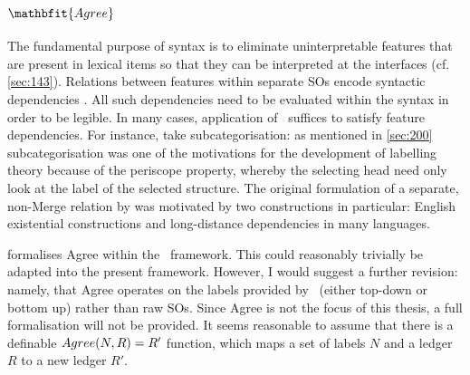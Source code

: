 \subsection[\Agree]{$\mathbfit{\Agree}$}\label{sec:480}

The fundamental purpose of syntax is to eliminate uninterpretable features that are present in lexical items so that they can be interpreted at the interfaces (cf. \autoref{sec:143}). Relations between features within separate SOs encode syntactic dependencies \parencite[cf.][]{AdgerD_2010}. All such dependencies need to be evaluated within the syntax in order to be legible. In many cases, application of \Merge\ suffices to satisfy feature dependencies. For instance, take subcategorisation: as mentioned in \autoref{sec:200} subcategorisation was one of the motivations for the development of labelling theory because of the periscope property, whereby the selecting head need only look at the label of the selected structure. The original formulation of a separate, non-Merge relation by \textcite{ChomskyN_2000,ChomskyN_2001} was motivated by two constructions in particular: English existential constructions and long-distance dependencies in many languages.

\textcite{MilwayD_2021} formalises Agree within the \CS\ framework. This could reasonably trivially be adapted into the present framework. However, I would suggest a further revision: namely, that Agree operates on the labels provided by \Label\ (either top-down or bottom up) rather than raw SOs. Since Agree is not the focus of this thesis, a full formalisation will not be provided. It seems reasonable to assume that there is a definable $Agree(N, R)=R'$ function, which maps a set of labels $N$ and a ledger $R$ to a new ledger $R'$.

